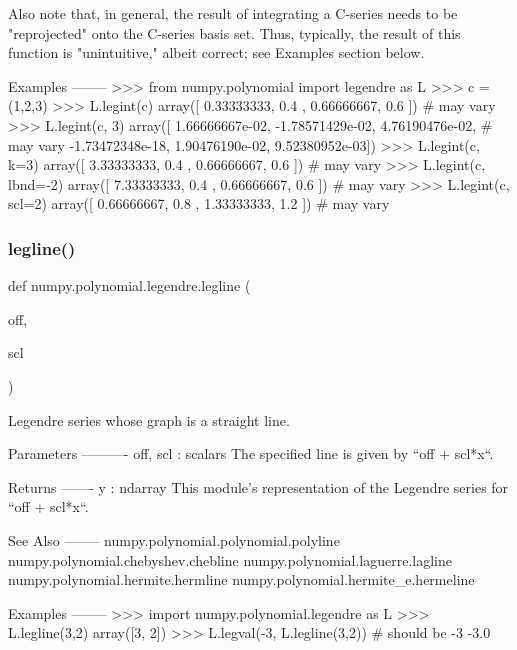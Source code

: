 \begin{DoxyVerb}
Also note that, in general, the result of integrating a C-series needs
to be "reprojected" onto the C-series basis set.  Thus, typically,
the result of this function is "unintuitive," albeit correct; see
Examples section below.

Examples
--------
>>> from numpy.polynomial import legendre as L
>>> c = (1,2,3)
>>> L.legint(c)
array([ 0.33333333,  0.4       ,  0.66666667,  0.6       ]) # may vary
>>> L.legint(c, 3)
array([  1.66666667e-02,  -1.78571429e-02,   4.76190476e-02, # may vary
         -1.73472348e-18,   1.90476190e-02,   9.52380952e-03])
>>> L.legint(c, k=3)
 array([ 3.33333333,  0.4       ,  0.66666667,  0.6       ]) # may vary
>>> L.legint(c, lbnd=-2)
array([ 7.33333333,  0.4       ,  0.66666667,  0.6       ]) # may vary
>>> L.legint(c, scl=2)
array([ 0.66666667,  0.8       ,  1.33333333,  1.2       ]) # may vary\end{DoxyVerb}
 \mbox{\label{namespacenumpy_1_1polynomial_1_1legendre_acb9eab48c02cb6ebfb9adb1373052b0a}} 
\subsubsection{\texorpdfstring{legline()}{legline()}}
{\footnotesize\ttfamily def numpy.\+polynomial.\+legendre.\+legline (\begin{DoxyParamCaption}\item[{}]{off,  }\item[{}]{scl }\end{DoxyParamCaption})}

\begin{DoxyVerb}Legendre series whose graph is a straight line.



Parameters
----------
off, scl : scalars
    The specified line is given by ``off + scl*x``.

Returns
-------
y : ndarray
    This module's representation of the Legendre series for
    ``off + scl*x``.

See Also
--------
numpy.polynomial.polynomial.polyline
numpy.polynomial.chebyshev.chebline
numpy.polynomial.laguerre.lagline
numpy.polynomial.hermite.hermline
numpy.polynomial.hermite_e.hermeline

Examples
--------
>>> import numpy.polynomial.legendre as L
>>> L.legline(3,2)
array([3, 2])
>>> L.legval(-3, L.legline(3,2)) # should be -3
-3.0\end{DoxyVerb}
 \mbox{\label{namespacenumpy_1_1polynomial_1_1legendre_aa6f050bcc0e660b48550fbaf524f772b}} 

